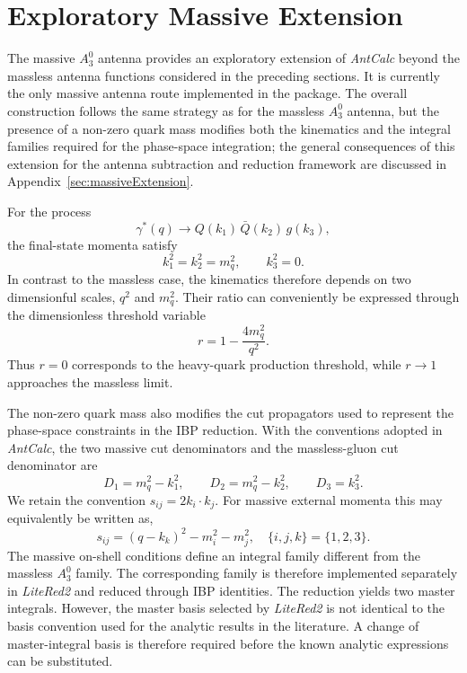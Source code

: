 \section{Exploratory Massive Extension}\label{sec:massiveA30}

The massive $A_3^0$ antenna provides an exploratory extension of \textit{AntCalc} beyond the
massless antenna functions considered in the preceding sections. It is currently the only
massive antenna route implemented in the package. The overall construction follows the same
strategy as for the massless $A_3^0$ antenna, but the presence of a non-zero quark mass
modifies both the kinematics and the integral families required for the phase-space
integration; the general consequences of this extension for the antenna subtraction and
reduction framework are discussed in Appendix~\ref{sec:massiveExtension}.

For the process
\begin{equation*}
    \gamma^*(q)\rightarrow Q(k_1)\,\bar Q(k_2)\,g(k_3),
\end{equation*}
the final-state momenta satisfy
\begin{equation*}
    k_1^2=k_2^2=m_q^2,\qquad k_3^2=0.
\end{equation*}
In contrast to the massless case, the kinematics therefore depends on two dimensionful scales,
$q^2$ and $m_q^2$. Their ratio can conveniently be expressed through the dimensionless
threshold variable
\begin{equation}\label{eq:thresholdr}
    r = 1 - \frac{4m_q^2}{q^2}.
\end{equation}
Thus $r=0$ corresponds to the heavy-quark production threshold, while $r\to1$ approaches the
massless limit.

The non-zero quark mass also modifies the cut propagators used to represent the phase-space
constraints in the IBP reduction. With the conventions adopted in \textit{AntCalc}, the two
massive cut denominators and the massless-gluon cut denominator are
\begin{equation}
    D_1 = m_q^2-k_1^2,\qquad D_2 = m_q^2-k_2^2,\qquad D_3 = k_3^2.
\end{equation}
We retain the convention $s_{ij}=2k_i\cdot k_j$. For massive external momenta this may
equivalently be written as,
\begin{equation}
    s_{ij} = (q-k_k)^2 - m_i^2 - m_j^2,\quad \{i,j,k\}=\{1,2,3\}.
\end{equation}
The massive on-shell conditions define an integral family different from the massless $A_3^0$
family. The corresponding family is therefore implemented separately in \textit{LiteRed2} and
reduced through IBP identities. The reduction yields two master integrals. However, the master
basis selected by \textit{LiteRed2} is not identical to the basis convention used for the
analytic results in the literature. A change of master-integral basis is therefore required
before the known analytic expressions can be substituted.

